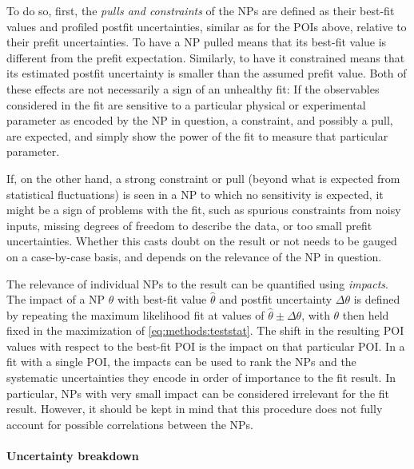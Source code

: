 To do so, first, the \textit{pulls and constraints} of the NPs are defined as their best-fit values and profiled postfit uncertainties, similar as for the POIs above, relative to their prefit uncertainties. To have a NP pulled means that its best-fit value is different from the prefit expectation. Similarly, to have it constrained means that its estimated postfit uncertainty is smaller than the assumed prefit value. Both of these effects are not necessarily a sign of an unhealthy fit: If the observables considered in the fit are sensitive to a particular physical or experimental parameter as encoded by the NP in question, a constraint, and possibly a pull, are expected, and simply show the power of the fit to measure that particular parameter.

If, on the other hand, a strong constraint or pull (beyond what is expected from statistical fluctuations) is seen in a NP to which no sensitivity is expected, it might be a sign of problems with the fit, such as spurious constraints from noisy inputs, missing degrees of freedom to describe the data, or too small prefit uncertainties. Whether this casts doubt on the result or not needs to be gauged on a case-by-case basis, and depends on the relevance of the NP in question.

The relevance of individual NPs to the result can be quantified using \textit{impacts}. The impact of a NP $\theta$ with best-fit value $\hat{\theta}$ and postfit uncertainty $\Delta \theta$ is defined by repeating the maximum likelihood fit at values of $\hat{\theta} \pm \Delta \theta$, with $\theta$ then held fixed in the maximization of \cref{eq:methods:teststat}. The shift in the resulting POI values with respect to the best-fit POI is the impact on that particular POI. In a fit with a single POI, the impacts can be used to rank the NPs and the systematic uncertainties they encode in order of importance to the fit result. In particular, NPs with very small impact can be considered irrelevant for the fit result. However, it should be kept in mind that this procedure does not fully account for possible correlations between the NPs.

\paragraph{Uncertainty breakdown} 

